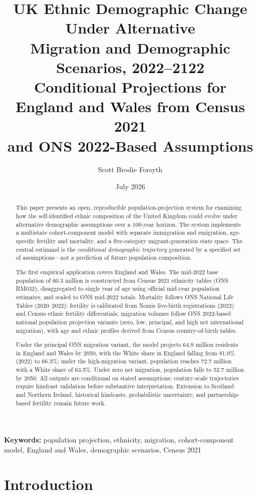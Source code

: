 \documentclass[12pt,a4paper]{article}
\title{%
  \textbf{UK Ethnic Demographic Change Under Alternative}\\[0.3em]
  \textbf{Migration and Demographic Scenarios, 2022--2122}\\[1em]
  \large Conditional Projections for England and Wales from Census 2021\\
  and ONS 2022-Based Assumptions
}
\author{Scott Brodie Forsyth}
\date{July 2026}
\begin{document}
\maketitle

\begin{abstract}
\noindent
This paper presents an open, reproducible population-projection system for examining how
the self-identified ethnic composition of the United Kingdom could evolve under alternative
demographic assumptions over a 100-year horizon. The system implements a multistate
cohort-component model with separate immigration and emigration, age-specific fertility and
mortality, and a five-category migrant-generation state space. The central estimand is the
\emph{conditional demographic trajectory} generated by a specified set of assumptions---not
a prediction of future population composition.

The first empirical application covers England and Wales. The mid-2022 base population of
60.3 million is constructed from Census 2021 ethnicity tables (ONS RM032), disaggregated to
single year of age using official mid-year population estimates, and scaled to ONS mid-2022
totals. Mortality follows ONS National Life Tables (2020--2022); fertility is calibrated
from Nomis live-birth registrations (2022) and Census ethnic fertility differentials;
migration volumes follow ONS 2022-based national population projection variants (zero, low,
principal, and high net international migration), with age and ethnic profiles derived from
Census country-of-birth tables.

Under the principal ONS migration variant, the model projects 64.9 million residents in
England and Wales by 2050, with the White share in England falling from 81.0\% (2022) to
66.3\%; under the high-migration variant, population reaches 72.7 million with a White share
of 63.5\%. Under zero net migration, population falls to 52.7 million by 2050. All outputs are
conditional on stated assumptions; century-scale trajectories require hindcast validation
before substantive interpretation. Extension to Scotland and Northern Ireland, historical
hindcasts, probabilistic uncertainty, and partnership-based fertility remain future work.
\end{abstract}

\vspace{1em}
\noindent\textbf{Keywords:} population projection, ethnicity, migration, cohort-component model,
England and Wales, demographic scenarios, Census 2021

\section{Introduction}
\end{document}
